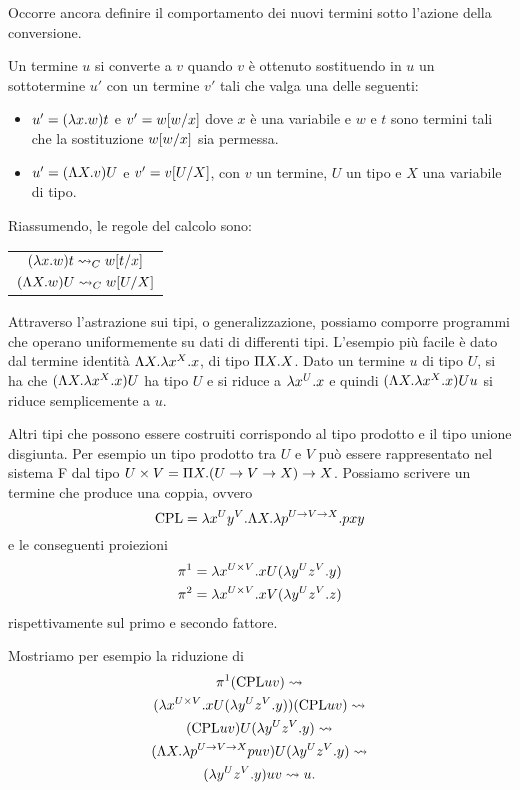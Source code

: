 \documentclass[]{marticle}
\begin{document}
Occorre ancora definire il comportamento dei nuovi termini sotto l'azione della
conversione.
\begin{block}[Definizione]
    Un termine $u$ si converte a $v$ quando $v$ \`e ottenuto sostituendo in $u$
    un sottotermine $u'$ con un termine $v'$ tali che valga una delle seguenti:
    \begin{itemize}
        \item $u'= (\l x. w)t$ e $v' = w\sub{w}{x}$ dove $x$ \`e una variabile e
            $w$ e $t$ sono termini tali che la sostituzione $w\sub{w}{x}$ sia
            permessa.
        \item $u' = (\L X.v)U$ e $v'=v\sub{U}{X}$, con $v$ un termine, $U$ un
            tipo e $X$ una variabile di tipo.
    \end{itemize}
    Riassumendo, le regole del calcolo sono:
\begin{center}
{\renewcommand{\arraystretch}{1.3} 
\begin{tabular}{|c|}
    \hline
    $(\l x. w) t \conv_C w\sub{t}{x}$ \\
    $(\L X. w) U \conv_C w\sub{U}{X}$ \\
    \hline
\end{tabular}
}
\end{center}
\end{block}

Attraverso l'astrazione sui tipi, o generalizzazione, possiamo comporre
programmi che operano uniformemente su dati di differenti tipi. L'esempio pi\`u
facile \`e dato dal termine identit\`a $\L X. \l x^X. x$, di tipo $\P X. X$.
Dato un termine $u$ di tipo $U$, si ha che $(\L X. \l x^X. x)U$ ha tipo $U$ e si
riduce a $\l x^U.x$ e quindi $(\L X. \l x^X. x)Uu$ si riduce semplicemente a
$u$.

Altri tipi che possono essere costruiti corrispondo al tipo prodotto e il tipo
unione disgiunta. Per esempio un tipo prodotto tra $U$ e $V$ pu\`o essere
rappresentato nel sistema F dal tipo $U\times V = \P X. (U\rar V \rar X) \rar
X$. Possiamo scrivere un termine che produce una coppia, ovvero
\[
    \text{CPL} = \l x^U  y^V. \L X. \l p^{U \rar V\rar X}. pxy
\]
e le conseguenti proiezioni
\begin{gather*}
    \pi^1 = \l x^{U\times V}. xU(\l y^U z^V.y) \\
    \pi^2 = \l x^{U\times V}. xV(\l y^U z^V.z)
\end{gather*}
rispettivamente sul primo e secondo fattore.

Mostriamo per esempio la riduzione di 
\begin{gather*}
    \pi^1 (\text{CPL}uv) \conv \\
    (\l x^{U\times V}. xU(\l y^U z^V.y))(\text{CPL}uv) \conv \\
    (\text{CPL}uv)U (\l y^U z^V.y) \conv \\
    (\L X. \l p^{U\rar V \rar X} puv)U (\l y^U z^V.y)  \conv \\
    (\l y^U z^V.y)uv \conv u.
\end{gather*}
\end{document}
